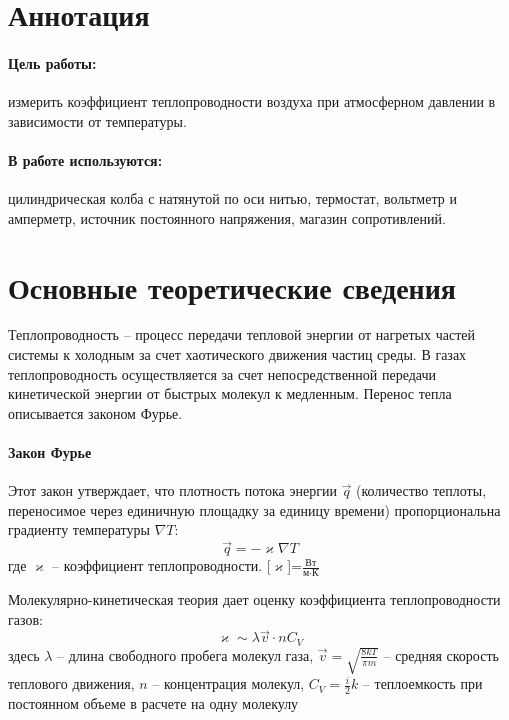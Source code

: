 \documentclass[a4paper,12pt]{report}
\begin{document}
	
	\newpage
    
    \section*{Аннотация}
        \paragraph*{Цель работы:} измерить коэффициент теплопроводности воздуха при атмосферном давлении в зависимости от температуры.
        \paragraph*{В работе используются:} цилиндрическая колба с натянутой по оси нитью, термостат, вольтметр и амперметр, источник постоянного напряжения, магазин сопротивлений.

    \section*{Основные теоретические сведения}
    Теплопроводность -- процесс передачи тепловой энергии от нагретых частей системы к холодным за счет хаотического движения частиц среды. В газах теплопроводность осуществляется за счет непосредственной передачи кинетической энергии от быстрых молекул к медленным. Перенос тепла описывается законом Фурье.
    \paragraph*{Закон Фурье}
    Этот закон утверждает, что плотность потока энергии $\vec{q}$ (количество теплоты, переносимое через единичную площадку за единицу времени) пропорциональна градиенту температуры $\nabla T$:
    \begin{equation}
        \label{fourier}
        \vec{q}=-\varkappa \nabla T
    \end{equation}
    где $\varkappa$ -- коэффициент теплопроводности. [$\varkappa$]=$\frac{\text{Вт}}{\text{м}\cdot\text{К}}$

    Молекулярно-кинетическая теория дает оценку коэффициента теплопроводности газов:
    \begin{equation}
        \label{varkappa approx}
        \varkappa \sim \lambda \vec{v} \cdot n C_V
    \end{equation}
    здесь $\lambda$ -- длина свободного пробега молекул газа, $\vec{v}=\sqrt{\frac{8kT}{\pi m}}$ -- средняя скорость теплового движения, $n$ -- концентрация молекул, $C_V=\frac{i}{2}k$ -- теплоемкость при постоянном объеме в расчете на одну молекулу
\end{document}

